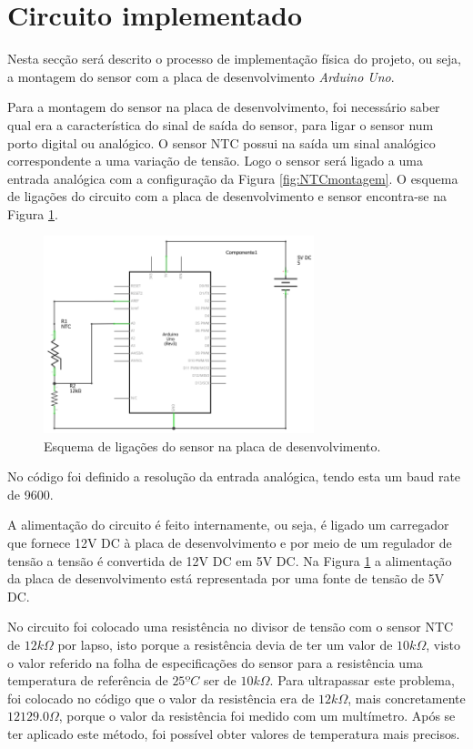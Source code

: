 \section{Circuito implementado}
Nesta secção será descrito o processo de implementação física do projeto, ou seja, a montagem do sensor com a placa de desenvolvimento \textit{Arduino Uno}.

Para a montagem do sensor na placa de desenvolvimento, foi necessário saber qual era a característica do sinal de saída do sensor, para ligar o sensor num porto digital ou analógico. O sensor NTC possui na saída um sinal analógico correspondente a uma variação de tensão. Logo o sensor será ligado a uma entrada analógica com a configuração da Figura \ref{fig:NTCmontagem}. O esquema de ligações do circuito com a placa de desenvolvimento e sensor encontra-se na Figura \ref{fig:CircuitoTotal}.
\begin{figure}[!htb]
    \centering
    \includegraphics[width=0.7\textwidth]{img/Esquema_de_ligacoes.PNG}
    \caption{Esquema de ligações do sensor na placa de desenvolvimento.}
    \label{fig:CircuitoTotal}
\end{figure}

No código foi definido a resolução da entrada analógica, tendo esta um baud rate de 9600.

A alimentação do circuito é feito internamente, ou seja, é ligado um carregador que fornece 12V DC à placa de desenvolvimento e por meio de um regulador de tensão a tensão é convertida de 12V DC em 5V DC. Na Figura \ref{fig:CircuitoTotal} a alimentação da placa de desenvolvimento está representada por uma fonte de tensão de 5V DC.

No circuito foi colocado uma resistência no divisor de tensão com o sensor NTC de \(12k\Omega\) por lapso, isto porque a resistência devia de ter um valor de \(10k\Omega\), visto o valor referido na folha de especificações do sensor para a resistência uma temperatura de referência de \(25ºC\) ser de \(10k\Omega\). Para ultrapassar este problema, foi colocado no código que o valor da resistência era de \(12k\Omega\), mais concretamente \(12129.0\Omega\), porque o valor da resistência foi medido com um multímetro. Após se ter aplicado este método, foi possível obter valores de temperatura mais precisos.